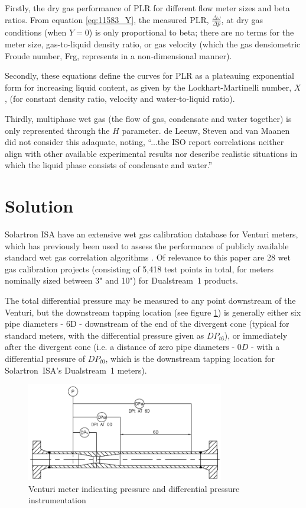 \documentclass[journal]{IEEEtran}
\begin{document}
Firstly, the dry gas performance of \acrshort{PLR} for different flow meter sizes and beta ratios. From equation \ref{eq:11583_Y}, the measured \acrshort{PLR}, $\frac{\Delta \omega}{\Delta p}$, at dry gas conditions (when $Y=0$) is only proportional to beta; there are no terms for the meter size, gas-to-liquid density ratio, or gas velocity (which the gas densiometric Froude number, \acrshort{Frg}, represents in a non-dimensional manner).

Secondly, these equations define the curves for \acrshort{PLR} as a plateauing exponential form for increasing liquid content, as given by the Lockhart-Martinelli number, $X$, (for constant density ratio, velocity and water-to-liquid ratio).

Thirdly, multiphase wet gas (the flow of gas, condensate and water together) is only represented through the $H$ parameter.  de Leeuw, Steven and van Maanen did not consider this adaquate, noting, ``...the ISO report correlations neither align with other available experimental results nor describe realistic situations in which the liquid phase consists of condensate and water.''

\section{Solution}

Solartron ISA have an extensive wet gas calibration database for Venturi meters, which has previously been used to assess the performance of publicly available standard wet gas correlation algorithms \cite{Collins2015}.  Of relevance to this paper are 28 wet gas calibration projects (consisting of 5,418 test points in total, for meters nominally sized between 3" and 10") for Dualstream~1 products.

The total differential pressure may be measured to any point downstream of the Venturi, but the downstream tapping location (see figure \ref{fig:Venturi}) is generally either six pipe diameters - $6$\acrshort{D} - downstream of the end of the divergent cone (typical for standard meters, with the differential pressure given as $DP_{t6}$), or immediately after the divergent cone (i.e. a distance of zero pipe diameters - $0D$ - with a differential pressure of $DP_{t0}$, which is the downstream tapping location for Solartron~ISA's Dualstream~1 meters).

\begin{figure}[ht]
\centering
\includegraphics[width=3.4in]{Venturi.png}
\caption[]{ Venturi meter indicating pressure and differential pressure\\instrumentation }
\label{fig:Venturi}
\end{figure}
\end{document}
